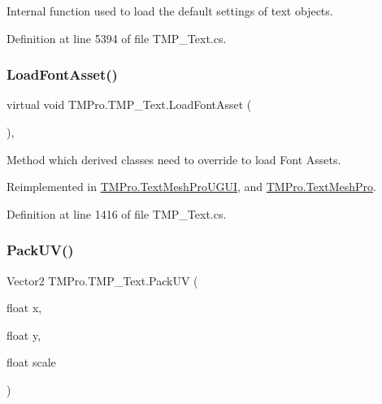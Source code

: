 Internal function used to load the default settings of text objects. 



Definition at line 5394 of file T\+M\+P\+\_\+\+Text.\+cs.

\mbox{\label{class_t_m_pro_1_1_t_m_p___text_a02b60cb23d3eceb1ea52a61f194d8bec}} 
\subsubsection{\texorpdfstring{LoadFontAsset()}{LoadFontAsset()}}
{\footnotesize\ttfamily virtual void T\+M\+Pro.\+T\+M\+P\+\_\+\+Text.\+Load\+Font\+Asset (\begin{DoxyParamCaption}{ }\end{DoxyParamCaption})\hspace{0.3cm}{\ttfamily [protected]}, {\ttfamily [virtual]}}



Method which derived classes need to override to load Font Assets. 



Reimplemented in \mbox{\hyperlink{class_t_m_pro_1_1_text_mesh_pro_u_g_u_i_aedbf6c9aaf6c104ac7c81e85d99498b4}{T\+M\+Pro.\+Text\+Mesh\+Pro\+U\+G\+UI}}, and \mbox{\hyperlink{class_t_m_pro_1_1_text_mesh_pro_a5bb3ac2d25483c61b10064917225ca59}{T\+M\+Pro.\+Text\+Mesh\+Pro}}.



Definition at line 1416 of file T\+M\+P\+\_\+\+Text.\+cs.

\mbox{\label{class_t_m_pro_1_1_t_m_p___text_ab3678ea5e10c2193b87d1ee79f8ef5c3}} 
\subsubsection{\texorpdfstring{PackUV()}{PackUV()}\hspace{0.1cm}{\footnotesize\ttfamily [1/2]}}
{\footnotesize\ttfamily Vector2 T\+M\+Pro.\+T\+M\+P\+\_\+\+Text.\+Pack\+UV (\begin{DoxyParamCaption}\item[{float}]{x,  }\item[{float}]{y,  }\item[{float}]{scale }\end{DoxyParamCaption})\hspace{0.3cm}{\ttfamily [protected]}}



